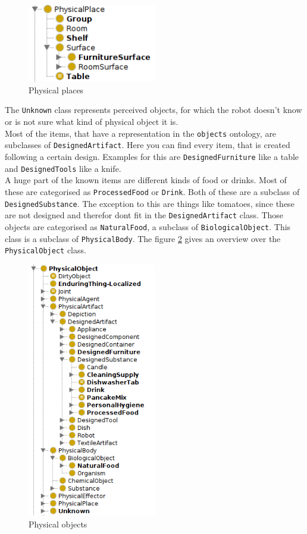 \documentclass[main.tex]{subfiles}
\begin{document}
\begin{figure}
\centering
\includegraphics[width=0.5\textwidth]{pictures/ontology/Ontologie_place}
\caption{Physical places}
\label{fig:place_ont}
\end{figure}

The \texttt{Unknown} class represents perceived objects, for which the robot doesn't know or is not sure what kind of physical object it is.\\
Most of the items, that have a representation in the \texttt{objects} ontology, are subclasses of \texttt{DesignedArtifact}.
Here you can find every item, that is created following a certain design. 
Examples for this are \texttt{DesignedFurniture} like a table and \texttt{DesignedTools} like a knife.\\
A huge part of the known items are different kinds of food or drinks. Most of these are categorised as \texttt{ProcessedFood} or \texttt{Drink}. Both of these are a subclass of \texttt{DesignedSubstance}. The exception to this are things like tomatoes, since these are not designed and therefor dont fit in the \texttt{DesignedArtifact} class. Those objects are categorised as \texttt{NaturalFood}, a subclass of \texttt{BiologicalObject}. This class is a subclass of \texttt{PhysicalBody}. The figure \ref{fig:object_ont} gives an overview over the \texttt{PhysicalObject} class.

\begin{figure}
\centering
\includegraphics[width=0.5\textwidth]{pictures/ontology/Ontologie_objects}
\caption{Physical objects}
\label{fig:object_ont}
\end{figure}
\end{document}
